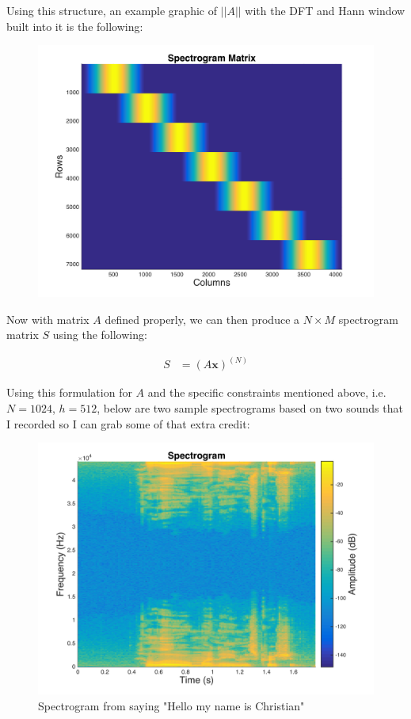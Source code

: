 \documentclass{article}[12pt]
\begin{document}
Using this structure, an example graphic of $||A||$ with the DFT and Hann window built into it is the following:

\begin{figure}[h]
\includegraphics[scale=0.35]{spectrogram_matrix}
\centering
\end{figure}

Now with matrix $A$ defined properly, we can then produce a $N \times M$ spectrogram matrix $S$ using the following:

\begin{align*}
S &= (A \boldsymbol{x})^{(N)}
\end{align*}

\newpage
Using this formulation for $A$ and the specific constraints mentioned above, i.e. $N = 1024$, $h = 512$, below are two sample spectrograms based on two sounds that I recorded so I can grab some of that extra credit:

\begin{figure}[h]
\includegraphics[scale=0.35]{hello_clip2_spectrogram}
\centering
\caption{Spectrogram from saying "Hello my name is Christian"}
\centering
\end{figure}
\end{document}

